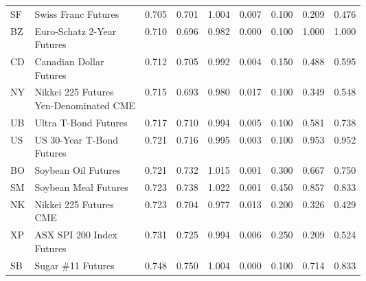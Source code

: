 \begin{longtable}{llrrrrrrr}
  SF &                                        Swiss Franc Futures &        0.705 &       0.701 &     1.004 &        0.007 &           0.100 &                0.209 &      0.476 \\
  BZ &                     \makecell{Euro-Schatz 2-Year\\Futures} &        0.710 &       0.696 &     0.982 &        0.000 &           0.100 &                1.000 &      1.000 \\
  CD &                        \makecell{Canadian Dollar\\Futures} &        0.712 &       0.705 &     0.992 &        0.004 &           0.150 &                0.488 &      0.595 \\
  NY &         \makecell{Nikkei 225 Futures\\Yen-Denominated CME} &        0.715 &       0.693 &     0.980 &        0.017 &           0.100 &                0.349 &      0.548 \\
  UB &                                       Ultra T-Bond Futures &        0.717 &       0.710 &     0.994 &        0.005 &           0.100 &                0.581 &      0.738 \\
  US &                      \makecell{US 30-Year T-Bond\\Futures} &        0.721 &       0.716 &     0.995 &        0.003 &           0.100 &                0.953 &      0.952 \\
  BO &                                        Soybean Oil Futures &        0.721 &       0.732 &     1.015 &        0.001 &           0.300 &                0.667 &      0.750 \\
  SM &                                       Soybean Meal Futures &        0.723 &       0.738 &     1.022 &        0.001 &           0.450 &                0.857 &      0.833 \\
  NK &                         \makecell{Nikkei 225 Futures\\CME} &        0.723 &       0.704 &     0.977 &        0.013 &           0.200 &                0.326 &      0.429 \\
  XP &                      \makecell{ASX SPI 200 Index\\Futures} &        0.731 &       0.725 &     0.994 &        0.006 &           0.250 &                0.209 &      0.524 \\
  SB &                                         Sugar \#11 Futures &        0.748 &       0.750 &     1.004 &        0.000 &           0.100 &                0.714 &      0.833 \\

\end{longtable}
